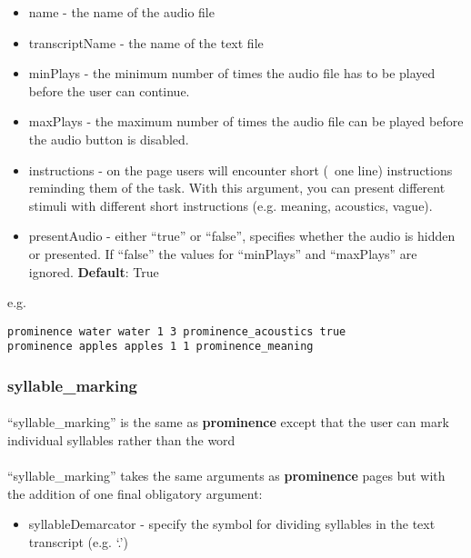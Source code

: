 \begin{itemize}
\item name - the name of the audio file
\item transcriptName - the name of the text file
\item minPlays - the minimum number of times the audio file has to be played before the user can continue.
\item maxPlays - the maximum number of times the audio file can be played before the audio button is disabled. 
\item instructions - on the page users will encounter short (~one line) instructions reminding them of the task.  With this argument, you can present different stimuli with different short instructions (e.g. meaning, acoustics, vague). 
\item presentAudio - either ``true'' or ``false'', specifies whether the audio is hidden or presented.  If ``false'' the values for ``minPlays'' and ``maxPlays'' are ignored. \textbf{Default}: True
\end{itemize}

e.g.

\begin{lstlisting}
prominence water water 1 3 prominence_acoustics true
prominence apples apples 1 1 prominence_meaning
\end{lstlisting}

\subsubsection{syllable\_marking}

\paragraph{}
``syllable\_marking'' is the same as \textbf{prominence} except that the user can mark individual syllables rather than the word

\paragraph{}
``syllable\_marking'' takes the same arguments as \textbf{prominence} pages but with the addition of one final obligatory argument:

\begin{itemize}
\item syllableDemarcator - specify the symbol for dividing syllables in the text transcript (e.g. `.')
\end{itemize}

